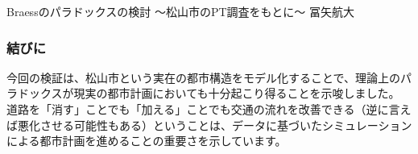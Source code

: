 \begin{column}{Braessのパラドックスの検討 〜松山市のPT調査をもとに〜 }{冨矢航大}
\subsubsection*{結びに}
今回の検証は、松山市という実在の都市構造をモデル化することで、理論上のパラドックスが現実の都市計画においても十分起こり得ることを示唆しました。
道路を「消す」ことでも「加える」ことでも交通の流れを改善できる（逆に言えば悪化させる可能性もある）ということは、データに基づいたシミュレーションによる都市計画を進めることの重要さを示しています。

\end{column}
\clearpage

